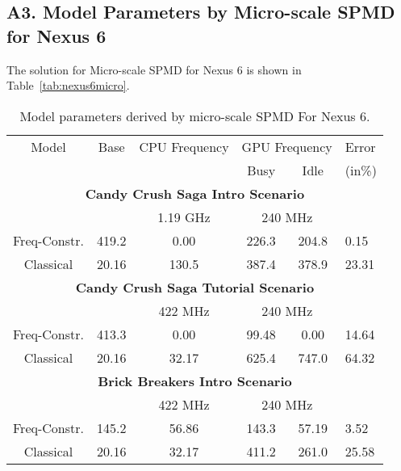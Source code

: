 \subsection*{A3. Model Parameters by Micro-scale SPMD for Nexus 6}
The solution for Micro-scale SPMD for Nexus 6 is shown in Table~\ref{tab:nexus6micro}.
\begin{table*}[tp]
\caption{Model parameters derived by micro-scale SPMD For Nexus 6.}
\vspace{-0.1in}
{\footnotesize
    \begin{tabular}{|c|c|c|c|c|p{5.4mm}|}
    \hline
        Model & Base & \multicolumn{1}{c|}{CPU Frequency} & \multicolumn{2}{c|}{GPU Frequency} & Error \\
    \cline{3-5}
        & & \multicolumn{1}{c|}{} & Busy & Idle & (in\%) \\
    \hline
    \multicolumn{6}{|c|}{\textbf{Candy Crush Saga Intro Scenario}} \\
        \hline
        &  & 1.19 GHz & \multicolumn{2}{c|}{240 MHz} & \\
        \hline
        Freq-Constr. & 419.2 & 0.00 & 226.3 & 204.8 & 0.15 \\
        \hline
        Classical & 20.16 & 130.5 & 387.4 & 378.9 & 23.31 \\
        \hline

    \multicolumn{6}{|c|}{\textbf{Candy Crush Saga Tutorial Scenario}} \\
        \hline
        &  & 422 MHz & \multicolumn{2}{c|}{240 MHz} & \\
        \hline
        Freq-Constr. & 413.3 & 0.00 & 99.48 & 0.00 & 14.64 \\
        \hline
        Classical & 20.16 & 32.17 & 625.4 & 747.0 & 64.32 \\
        \hline

    \multicolumn{6}{|c|}{\textbf{Brick Breakers Intro Scenario}} \\
        \hline
        &  & 422 MHz & \multicolumn{2}{c|}{240 MHz} & \\
        \hline
        Freq-Constr. & 145.2 & 56.86 & 143.3 & 57.19 & 3.52 \\
        \hline
        Classical & 20.16 & 32.17 & 411.2 & 261.0 & 25.58 \\
        \hline


\end{tabular}}
\end{table*}
